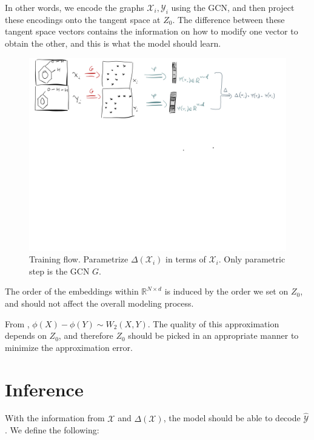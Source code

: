 \documentclass{article}
\begin{document}
In other words, we encode the graphs $\mathcal{X}_i, \mathcal{Y}_i$ using the GCN, and then project these encodings onto the tangent space at $Z_0$. The difference between these tangent space vectors contains the information on how to modify one vector to obtain the other, and this is what the model should learn.

\begin{figure}[h!t]
    \label{fig:train}
    \begin{center}
        \includegraphics[page=2,width=\textwidth, trim=0 40cm 0 0 ,clip,angle=0]{images/model_outline_train.png}
        \caption{Training flow. Parametrize $\Delta(\mathcal{X}_i)$ in terms of $\mathcal{X}_i$. Only parametric step is the GCN $G$.}
    \end{center}
\end{figure}


The order of the embeddings within $\mathbb{R}^{N\times d}$ is induced by the order we set on $Z_0$, and should not affect the overall modeling process.

From \cite{kolouri2020wasserstein}, $\phi(X) - \phi(Y)\sim W_2(X,Y)$. The quality of this approximation depends on $Z_0$, and therefore $Z_0$ should be picked in an appropriate manner to minimize the approximation error.

\section{Inference}
With the information from $\mathcal{X}$ and $\Delta(\mathcal{X})$, the model should be able to decode $\hat{\mathcal{Y}}$. We define the following:
\end{document}
